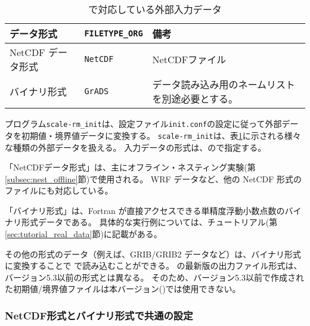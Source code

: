 \section{\SecInputDataSetting} \label{sec:adv_datainput}

\begin{table}[htb]
\begin{center}
\caption{\scalelib で対応している外部入力データ}
\begin{tabularx}{150mm}{|l|l|X|} \hline
 \rowcolor[gray]{0.9} データ形式      & \verb|FILETYPE_ORG|  & 備考 \\ \hline
 NetCDF データ形式   & \verb|NetCDF|     &  NetCDFファイル \\ \hline
 バイナリ形式 & \verb|GrADS|        & データ読み込み用のネームリストを別途必要とする。       \\ \hline
\end{tabularx}
\label{tab:inputdata_format}
\end{center}
\end{table}

プログラム\verb|scale-rm_init|は、設定ファイル\verb|init.conf|の設定に従って外部データを初期値・境界値データに変換する。
\verb|scale-rm_init|は、表\ref{tab:inputdata_format}に示される様々な種類の外部データを扱える。
入力データの形式は、ので指定する。

「NetCDFデータ形式」は、主にオフライン・ネスティング実験(第\ref{subsec:nest_offline}節)で使用される。
WRF データなど、他の NetCDF 形式のファイルにも対応している。


「バイナリ形式」は、Fortran が直接アクセスできる単精度浮動小数点数のバイナリ形式データである。
具体的な実行例については、チュートリアル(第\ref{sec:tutorial_real_data}節)に記載がある。


その他の形式のデータ（例えば、GRIB/GRIB2 データなど）は、バイナリ形式に変換することで {\scalerm} で読み込むことができる。
{\scalelib}の最新版の出力ファイル形式は、バージョン5.3以前の形式とは異なる。
そのため、バージョン5.3以前で作成された初期値/境界値ファイルは本バージョン({\scalelib}{\version})では使用できない。

\subsubsection{NetCDF形式とバイナリ形式で共通の設定} \label{sec:datainput_common_setting}

